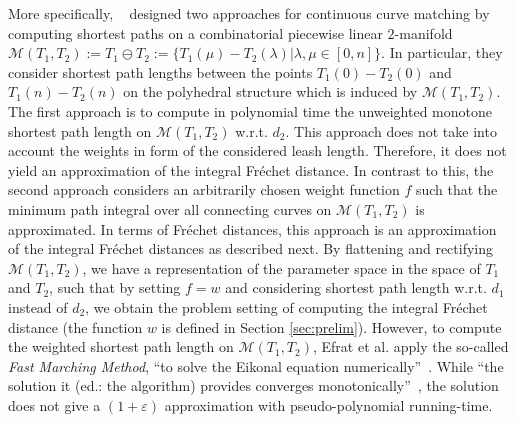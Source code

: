 \documentclass[a4paper,11pt]{article}
\begin{document}
	More specifically, ~\cite{efrat:mathching} designed two approaches for continuous curve matching by computing shortest paths on a combinatorial piecewise linear $2$-manifold $\mathcal{M}(T_1,T_2) := T_1 \ominus T_2 := \{ T_1(\mu) - T_2(\lambda) | \lambda,\mu \in [0,n] \}$. In particular, they consider shortest path lengths between the points $T_1(0) - T_2(0)$ and $T_1(n) - T_2(n)$ on the polyhedral structure which is induced by $\mathcal{M}(T_1,T_2)$. The first approach is to compute in polynomial time the unweighted monotone shortest path length on $\mathcal{M}(T_1,T_2)$ w.r.t. $d_2$. This approach does not take into account the weights in form of the considered leash length. Therefore, it does not yield an approximation of the integral Fr\'{e}chet distance. In contrast to this, the second approach considers an arbitrarily chosen weight function $f$ such that the minimum path integral over all connecting curves on $\mathcal{M}(T_1,T_2)$ is approximated. In terms of Fr\'{e}chet distances, this approach is an approximation of the integral Fr\'{e}chet distances as described next. By flattening and rectifying $\mathcal{M}(T_1,T_2)$, we have a representation of the parameter space in the space of $T_1$ and $T_2$, such that by setting $f = w$ and considering shortest path length w.r.t. $d_1$ instead of $d_2$, we obtain the problem setting of computing the integral Fr\'{e}chet distance (the function $w$ is defined in Section \ref{sec:prelim}). However, to compute the weighted shortest path length on $\mathcal{M}(T_1,T_2)$, Efrat et al. apply the so-called \emph{Fast Marching Method}, ``to solve the Eikonal equation numerically''~\cite[p. 211]{efrat:mathching}. While ``the solution it (ed.: the algorithm) provides converges monotonically''~\cite[p. 211]{efrat:mathching}, the solution does not give a $(1+\varepsilon)$ approximation with pseudo-polynomial running-time.
\end{document}
